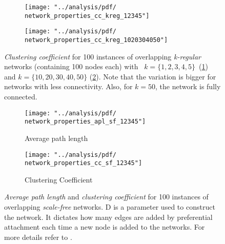 \begin{figure}[H]
\centering
\begin{subfigure}{.5\linewidth}
  \centering
 \texttt{[image: "../analysis/pdf/ network\_properties\_cc\_kreg\_12345"]}
 \caption{}
 \label{append_fig:network_properties_cc_kreg_12345}
\end{subfigure}%
\begin{subfigure}{.5\linewidth}
  \centering
 \texttt{[image: "../analysis/pdf/ network\_properties\_cc\_kreg\_1020304050"]}
 \caption{}
 \label{append_fig:network_properties_cc_kreg_1020304050}
\end{subfigure}
\begin{minipage}{0.9\linewidth}
\vspace{0.2cm}
\caption{\textit{Clustering coefficient} for 100 instances of overlapping \textit{k-regular} networks (containing 100 nodes each) with ~$k=\{1,2,3,4,5\}$~(\ref{append_fig:network_properties_cc_kreg_12345}) and  $k= \{10,20,30,40,50\}$ (\ref{append_fig:network_properties_cc_kreg_1020304050}). Note that the variation is bigger for networks with less connectivity. Also, for $k=50$, the network is fully connected.}
\label{append_fig:network_properties_cc_kreg}
\end{minipage}
\end{figure}

\begin{figure}[H]
\centering
\begin{subfigure}{.5\linewidth}
  \centering
 \texttt{[image: "../analysis/pdf/ network\_properties\_apl\_sf\_12345"]}
 \caption{Average path length}
 \label{append_fig:network_properties_apl_sf_12345}
\end{subfigure}%
\begin{subfigure}{.5\linewidth}
  \centering
 \texttt{[image: "../analysis/pdf/ network\_properties\_cc\_sf\_12345"]}
 \caption{Clustering Coefficient}
 \label{append_fig:network_properties_cc_sf_12345}
\end{subfigure}
\begin{minipage}{0.9\linewidth}
	\vspace{0.2cm}
	\caption{\textit{Average path length} and \textit{clustering coefficient} for 100 instances of overlapping \textit{scale-free} networks. D is a parameter used to construct the network. It dictates how many edges are added by preferential attachment each time a new node is added to the networks. For more details refer to \cite{Barabasi1999}.}
	\label{append_fig:network_properties_sf}
\end{minipage}
\end{figure}


